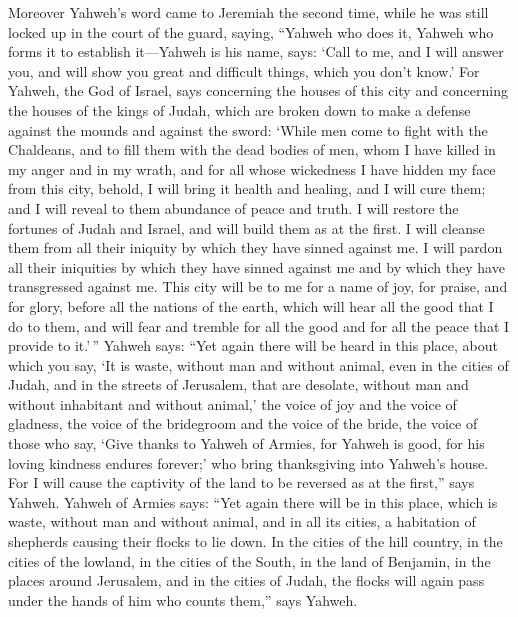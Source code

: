  Moreover Yahweh's word came to Jeremiah the second time,
while he was still locked up in the court of the guard, saying,
 ``Yahweh who does it, Yahweh who forms it to establish
it---Yahweh is his name, says:  `Call to me, and I will
answer you, and will show you great and difficult things, which you
don't know.'  For Yahweh, the God of Israel, says
concerning the houses of this city and concerning the houses of the
kings of Judah, which are broken down to make a defense against the
mounds and against the sword:  `While men come to fight
with the Chaldeans, and to fill them with the dead bodies of men, whom I
have killed in my anger and in my wrath, and for all whose wickedness I
have hidden my face from this city,  behold, I will bring
it health and healing, and I will cure them; and I will reveal to them
abundance of peace and truth.  I will restore the fortunes
of Judah and Israel, and will build them as at the first. 
I will cleanse them from all their iniquity by which they have sinned
against me. I will pardon all their iniquities by which they have sinned
against me and by which they have transgressed against me.
 This city will be to me for a name of joy, for praise,
and for glory, before all the nations of the earth, which will hear all
the good that I do to them, and will fear and tremble for all the good
and for all the peace that I provide to it.'\,''  Yahweh
says: ``Yet again there will be heard in this place, about which you
say, `It is waste, without man and without animal, even in the cities of
Judah, and in the streets of Jerusalem, that are desolate, without man
and without inhabitant and without animal,'  the voice of
joy and the voice of gladness, the voice of the bridegroom and the voice
of the bride, the voice of those who say, `Give thanks to Yahweh of
Armies, for Yahweh is good, for his loving kindness endures forever;'
who bring thanksgiving into Yahweh's house. For I will cause the
captivity of the land to be reversed as at the first,'' says Yahweh.
 Yahweh of Armies says: ``Yet again there will be in this
place, which is waste, without man and without animal, and in all its
cities, a habitation of shepherds causing their flocks to lie down.
 In the cities of the hill country, in the cities of the
lowland, in the cities of the South, in the land of Benjamin, in the
places around Jerusalem, and in the cities of Judah, the flocks will
again pass under the hands of him who counts them,'' says Yahweh.

